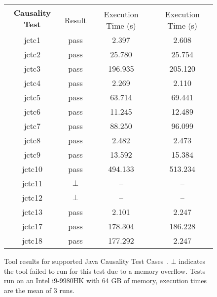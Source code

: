 



\begin{figure}[t]
\begin{center}
  \begin{tabularx}{0.7\textwidth}{c||c|c|c}
    \multirow{2}{*}{\bf Causality Test}   & \multicolumn{2}{c|}{\PwTc{}}    & \PwT{}\\
    \cline{2-4}
                                     & Result & Execution Time (s)  & Execution Time (s) \\
    \cline{1-4}
    jctc1                            & pass   & 2.397               & 2.608              \\
    jctc2                            & pass   & 25.780              & 25.754             \\
    jctc3                            & pass   & 196.935             & 205.120            \\
    jctc4                            & pass   & 2.269               & 2.110              \\
    jctc5                            & pass   & 63.714              & 69.441             \\
    jctc6                            & pass   & 11.245              & 12.489             \\
    jctc7                            & pass   & 88.250              & 96.099             \\
    jctc8                            & pass   & 2.482               & 2.473              \\
    jctc9                            & pass   & 13.592              & 15.384             \\
    jctc10                           & pass   & 494.133             & 513.234            \\
    jctc11                           & $\bot$ & --                  & --                 \\
    jctc12                           & $\bot$ & --                  & --                 \\
    jctc13                           & pass   & 2.101               & 2.247              \\
    jctc17                           & pass   & 178.304             & 186.228            \\
    jctc18                           & pass   & 177.292             & 2.247              \\
  \end{tabularx}
  \caption{\label{fig:tool} Tool results for supported Java Causality Test Cases~\cite{PughWebsite}. $\bot$ indicates the tool failed to run for this test due to a memory overflow. Tests run on an Intel i9-9980HK with 64 GB of memory, execution times are the mean of 3 runs.}
\end{center}
\end{figure}
